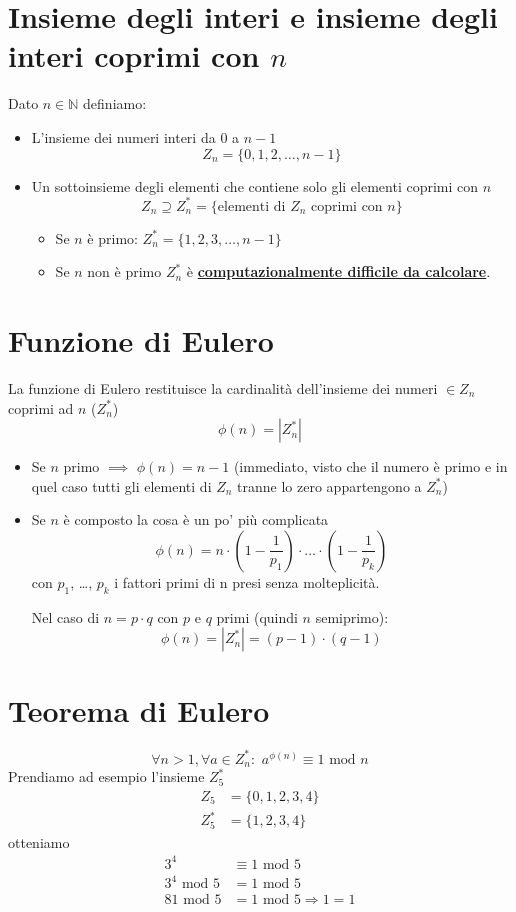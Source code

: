 \section{Insieme degli interi e insieme degli interi coprimi con $n$} Dato $n \in \mathbb{N}$ definiamo:
\begin{itemize}
	\item L'insieme dei numeri interi da $0$ a $n-1$
	$$Z_{n} = \{ 0, 1, 2, \dots, n-1 \}$$
	\item Un sottoinsieme degli elementi che contiene solo gli elementi coprimi con $n$
	$$Z_{n} \supseteq Z_{n}^{*} = \{\text{elementi di $Z_{n}$ coprimi con $n$}\}$$
	\begin{itemize}
		\item Se $n$ è primo: $Z_{n}^* = \{1, 2, 3, \dots, n-1\}$
		\item Se $n$ non è primo $Z_{n}^*$ è \textbf{\underline{computazionalmente difficile da calcolare}}.
	\end{itemize}
\end{itemize}

\section{Funzione di Eulero} La funzione di Eulero restituisce la cardinalità dell'insieme dei numeri $\in Z_n$ coprimi ad $n$ ($Z_{n}^{*}$)
$$ \phi(n) = |Z_{n}^{*}|$$
\begin{itemize}
	\item Se $n$ primo $\implies$ $\phi(n) = n-1$ (immediato, visto che il numero è primo e in quel caso tutti gli elementi di $Z_{n}$ tranne lo zero appartengono a $Z_{n}^{*}$)
	\item Se $n$ è composto la cosa è un po' più complicata
	$$ \phi(n) = n \cdot \left(1 - \frac{1}{p_1}\right) \cdot \dots \cdot \left(1 - \frac{1}{p_k}\right)$$
	con $p_1$, \dots, $p_k$ i fattori primi di n presi senza molteplicità.
	\begin{framed}
		Nel caso di $n = p \cdot q$ con $p$ e $q$ primi (quindi $n$ semiprimo):
		$$ \phi(n) =  |Z_{n}^{*}|= (p-1) \cdot (q-1) $$
	\end{framed}
\end{itemize}


\section{Teorema di Eulero}
$$ \boxed{\forall n>1, \forall a \in Z_{n}^*:\,\,a^{\phi(n)}\equiv 1 \text{ mod } n} $$
Prendiamo ad esempio l'insieme $Z_5^{*}$
\begin{align*}
	Z_5 &= \{ 0,1,2,3,4\}\\
	Z_5^{*} &= \{1,2,3,4\}
\end{align*}
otteniamo 
\begin{align*}
	3^{4} &\equiv 1 \text{ mod } 5\\
	3^{4} \text { mod } 5 &= 1 \text{ mod } 5\\
	81 \text { mod } 5 &= 1 \text{ mod } 5 \Longrightarrow 1 = 1
\end{align*}
